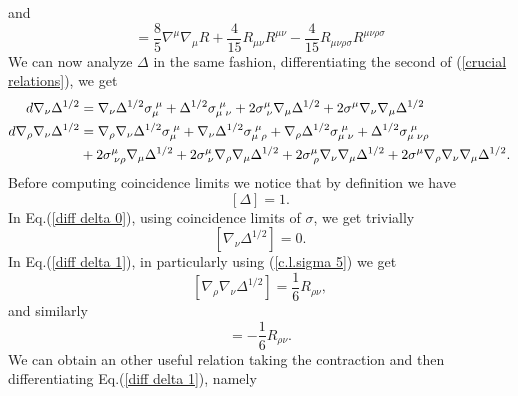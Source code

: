 and
\begin{equation}
    [\sigma_{\mu\,\;\nu\,\;\sigma}^{\,\;\mu\,\;\nu\,\;\sigma}]=\frac{8}{5}\nabla^\mu\nabla_\mu R + \frac{4}{15} R_{\mu\nu} R^{\mu\nu} - \frac{4}{15}R_{\mu\nu\rho\sigma}R^{\mu\nu\rho\sigma}
\end{equation}
We can now analyze $\Delta$ in the same fashion, differentiating the second of (\ref{crucial relations}), we get
\begin{align}
    d\nabla_\nu \Delta^{1/2} &= \nabla_\nu \Delta^{1/2} \sigma_\mu^{\;\mu} + \Delta^{1/2} \sigma_{\mu\;\nu}^{\;\mu} + 2 \sigma^\mu_{\;\nu} \nabla_\mu \Delta^{1/2} + 2\sigma^\mu \nabla_\nu \nabla_\mu \Delta^{1/2}\label{diff delta 0}\\
    d\nabla_\rho \nabla_\nu \Delta^{1/2} &= \nabla_\rho\nabla_\nu \Delta^{1/2} \sigma_\mu^{\;\mu} + \nabla_\nu\Delta^{1/2} \sigma_{\mu\;\rho}^{\;\mu} + \nabla_\rho \Delta^{1/2} \sigma_{\mu\;\nu}^{\;\mu} +\Delta^{1/2} \sigma_{\mu\;\nu\rho}^{\;\mu}\label{diff delta 1}\\
    &+ 2 \sigma^\mu_{\;\nu\rho} \nabla_\mu \Delta^{1/2} +2 \sigma^\mu_{\;\nu} \nabla_\rho \nabla_\mu \Delta^{1/2} + 2\sigma^\mu_{\;\rho} \nabla_\nu \nabla_\mu \Delta^{1/2} + 2\sigma^\mu \nabla_\rho\nabla_\nu \nabla_\mu \Delta^{1/2}. \notag
\end{align}
Before computing coincidence limits we notice that by definition we have
\begin{equation}\label{c.l.delta 0}
    [\Delta] = 1.
\end{equation}
In Eq.(\ref{diff delta 0}), using coincidence limits of $\sigma$, we get trivially
\begin{equation}\label{c.l.delta 1}
    [\nabla_\nu \Delta^{1/2} ] = 0.
\end{equation}
In Eq.(\ref{diff delta 1}), in particularly using (\ref{c.l.sigma 5}) we get
\begin{equation}\label{c.l.delta 2}
    [\nabla_\rho \nabla_\nu \Delta^{1/2}] = \frac{1}{6} R_{\rho\nu},
\end{equation}
and similarly
\begin{equation}
    [\nabla_\rho \nabla_\nu \Delta^{-1/2}] = -\frac{1}{6} R_{\rho\nu}.
\end{equation}
We can obtain an other useful relation taking the contraction and then differentiating Eq.(\ref{diff delta 1}), namely
